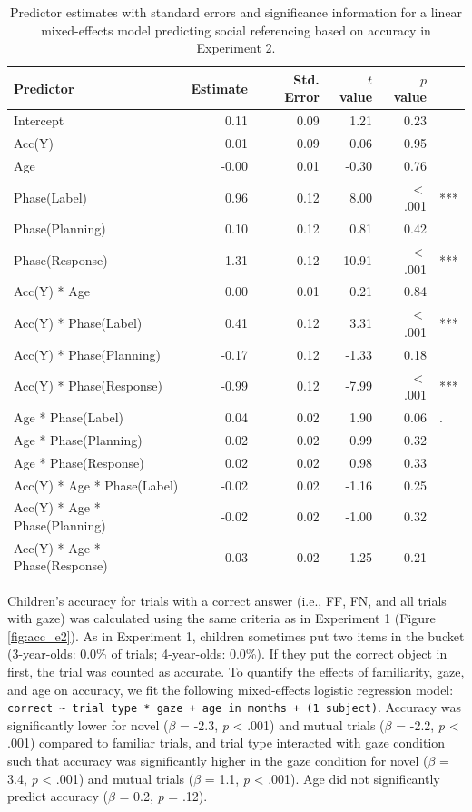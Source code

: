 \documentclass[a4paper,man,apacite,floatsintext]{apa6}
\begin{document}
\begin{table}[b]
\centering
\begin{tabular}{lrrrrl}
 Predictor & Estimate & Std. Error & $t$ value & $p$ value &  \\ 
  \hline
Intercept & 0.11 & 0.09 & 1.21 & 0.23 &  \\ 
  Acc(Y) & 0.01 & 0.09 & 0.06 & 0.95 &  \\ 
  Age & -0.00 & 0.01 & -0.30 & 0.76 &  \\ 
  Phase(Label) & 0.96 & 0.12 & 8.00 & $<$ .001 & *** \\ 
  Phase(Planning) & 0.10 & 0.12 & 0.81 & 0.42 &  \\ 
  Phase(Response) & 1.31 & 0.12 & 10.91 & $<$ .001 & *** \\ 
  Acc(Y) * Age & 0.00 & 0.01 & 0.21 & 0.84 &  \\ 
  Acc(Y) * Phase(Label) & 0.41 & 0.12 & 3.31 & $<$ .001 & *** \\ 
  Acc(Y) * Phase(Planning) & -0.17 & 0.12 & -1.33 & 0.18 &  \\ 
  Acc(Y) * Phase(Response) & -0.99 & 0.12 & -7.99 & $<$ .001 & *** \\ 
  Age * Phase(Label) & 0.04 & 0.02 & 1.90 & 0.06 & . \\ 
  Age * Phase(Planning) & 0.02 & 0.02 & 0.99 & 0.32 &  \\ 
  Age * Phase(Response) & 0.02 & 0.02 & 0.98 & 0.33 &  \\ 
  Acc(Y) * Age * Phase(Label) & -0.02 & 0.02 & -1.16 & 0.25 &  \\ 
  Acc(Y) * Age * Phase(Planning) & -0.02 & 0.02 & -1.00 & 0.32 &  \\ 
  Acc(Y) * Age * Phase(Response) & -0.03 & 0.02 & -1.25 & 0.21 &  \\ 
   \hline
\end{tabular}
\caption{Predictor estimates with standard errors and significance information for a linear mixed-effects model predicting social referencing based on accuracy in Experiment 2.} 
\label{tab:exp2acc_reg}
\end{table}

Children's accuracy for trials with a correct answer (i.e., FF, FN, and
all trials with gaze) was calculated using the same criteria as in
Experiment 1 (Figure \ref{fig:acc_e2}). As in Experiment 1, children
sometimes put two items in the bucket (3-year-olds: 0.0\% of trials;
4-year-olds: 0.0\%). If they put the correct object in first, the trial
was counted as accurate. To quantify the effects of familiarity, gaze,
and age on accuracy, we fit the following mixed-effects logistic
regression model:
\texttt{correct\ \textasciitilde{}\ trial\ type\ *\ gaze\ +\ age\ in\ months\ +\ (1\textbar{}\ subject)}.
Accuracy was significantly lower for novel (\(\beta\) = -2.3, \emph{p}
\textless{} .001) and mutual trials (\(\beta\) = -2.2, \emph{p}
\textless{} .001) compared to familiar trials, and trial type interacted
with gaze condition such that accuracy was significantly higher in the
gaze condition for novel (\(\beta\) = 3.4, \emph{p} \textless{} .001)
and mutual trials (\(\beta\) = 1.1, \emph{p} \textless{} .001). Age did
not significantly predict accuracy (\(\beta\) = 0.2, \emph{p} = .12).
\end{document}
